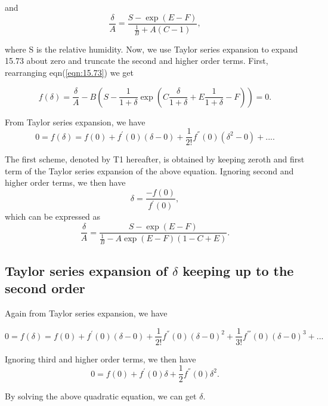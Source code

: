 \documentclass[12pt]{article}
\begin{document}
{and 
\begin{equation}\label{eqn:15.74}
\frac{\delta}{A}=\frac{S-\exp(E-F)}{\frac{1}{B}+A(C-1)},
\end{equation}

where S is the relative humidity. Now, we use Taylor series expansion to expand 15.73 about zero and truncate the second and higher order terms. First, rearranging  eqn(\ref{eqn:15.73}) we get

\begin{equation}\label{eqn:26}
f(\delta)=\frac{\delta}{A}-B(S-\frac{1}{1+\delta}\exp(C\frac{\delta}{1+\delta}+E \frac{1}{1+\delta}-F))=0.
\end{equation}


From Taylor series expansion, we have
\begin{equation}\label{eqn:27}
0=f(\delta)=f(0)+f^{'}(0)(\delta-0)+\frac{1}{2!}f^{''}(0)(\delta^{2}-0)+....
\end{equation}

The first scheme, denoted by T1 hereafter, is obtained by keeping zeroth and first term of the Taylor series expansion of the above equation. Ignoring second and higher order terms, we then have
\begin{equation}\label{eqn:28}
\delta=\frac{-f(0)}{f^{'}(0)},
\end{equation}
which can be expressed as
\begin{equation}\label{eqn:29}
\frac{\delta}{A}=\frac{S-\exp(E-F)}{\frac{1}{B}-A \exp(E-F) (1-C+E)}.
\end{equation}

\subsection{Taylor series expansion of $\delta$ keeping up to the second order}

Again from Taylor series expansion, we have

\begin{equation}\label{eqn:30}
0=f(\delta)=f(0)+f^{'}(0)(\delta-0)+\frac{1}{2!}f^{''}(0)(\delta-0)^{2}+ \frac{1}{3!} f^{'''}(0)(\delta-0)^{3}+...
\end{equation}

Ignoring third and higher order terms, we then have
\begin{equation}\label{eqn:31}
0=f(0)+f^{'}(0)\delta+\frac{1}{2}f^{''}(0)\delta^{2}.
\end{equation}

By solving the above quadratic equation, we can get $\delta$.

}
\end{document}
